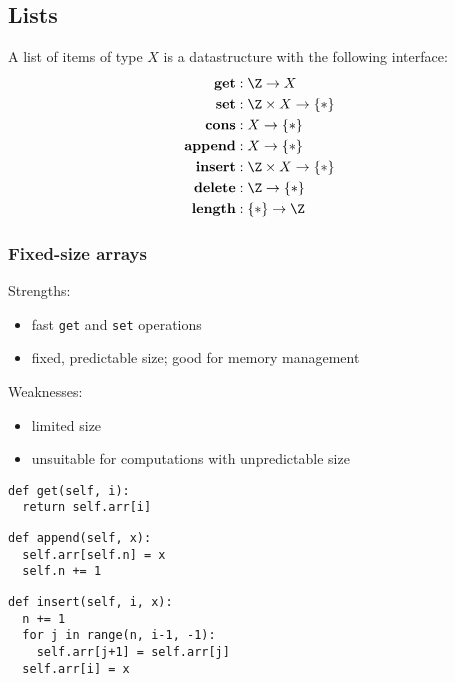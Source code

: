 \documentclass{article}
\begin{document}
\subsection{Lists}

\begin{definition}
	A list of items of type $X$ is a datastructure with the
	following interface:
	\begin{align*}
		\textbf{get} &: \Z \to X \\
		\textbf{set} &: \Z\times X\to\{*\}\\
		\textbf{cons} &: X\to \{*\}\\
		\textbf{append} &: X\to \{*\}\\
		\textbf{insert} &: \Z\times X \to \{*\}\\
		\textbf{delete} &: \Z\to \{*\}\\
		\textbf{length} &: \{*\} \to \Z
	\end{align*}
\end{definition}

\subsubsection{Fixed-size arrays}
\begin{multicols}{2}
\noindent Strengths:
\begin{itemize}
	\item fast \texttt{get} and \texttt{set} operations
	\item fixed, predictable size; good for memory management
\end{itemize}

\noindent Weaknesses:
\begin{itemize}
	\item limited size
	\item unsuitable for computations with unpredictable size
\end{itemize}

\begin{verbatim}
def get(self, i):
  return self.arr[i]
\end{verbatim}

\begin{verbatim}
def append(self, x):
  self.arr[self.n] = x
  self.n += 1
\end{verbatim}

\begin{verbatim}
def insert(self, i, x):
  n += 1
  for j in range(n, i-1, -1):
    self.arr[j+1] = self.arr[j]
  self.arr[i] = x
\end{verbatim}
\end{multicols}
\end{document}
